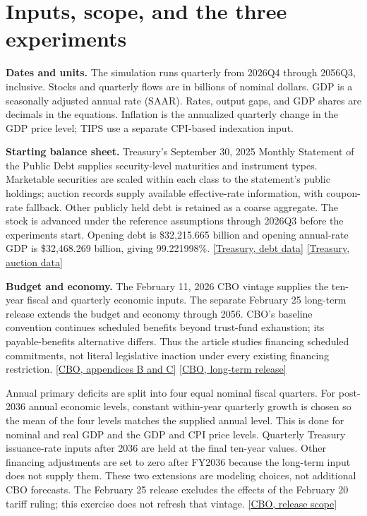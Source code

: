 \documentclass[11pt,letterpaper]{article}
\newcommand{\src}[2]{\href{#1}{#2}}
\begin{document}
\section{Inputs, scope, and the three experiments}

\textbf{Dates and units.}
The simulation runs quarterly from 2026Q4 through 2056Q3, inclusive.
Stocks and quarterly flows are in billions of nominal dollars. GDP is a
seasonally adjusted annual rate (SAAR). Rates, output gaps, and GDP shares are
decimals in the equations. Inflation is the annualized quarterly change in
the GDP price level; TIPS use a separate CPI-based indexation input.

\textbf{Starting balance sheet.}
Treasury's September 30, 2025 Monthly Statement of the Public Debt supplies
security-level maturities and instrument types. Marketable securities are
scaled within each class to the statement's public holdings; auction records
supply available effective-rate information, with coupon-rate fallback.
Other publicly held debt is retained as a coarse aggregate. The stock is
advanced under the reference assumptions through 2026Q3 before the experiments
start. Opening debt is \$32,215.665 billion and opening annual-rate GDP is
\$32,468.269 billion, giving 99.221998\%.
\src{https://fiscaldata.treasury.gov/datasets/monthly-statement-public-debt/}
{[Treasury, debt data]}
\src{https://fiscaldata.treasury.gov/datasets/treasury-securities-auctions-data/}
{[Treasury, auction data]}

\textbf{Budget and economy.}
The February 11, 2026 CBO vintage supplies the ten-year fiscal and quarterly
economic inputs. The separate February 25 long-term release extends the
budget and economy through 2056. CBO's baseline convention continues scheduled
benefits beyond trust-fund exhaustion; its payable-benefits alternative
differs. Thus the article studies financing scheduled commitments, not literal
legislative inaction under every existing financing restriction.
\src{https://www.cbo.gov/publication/62105}{[CBO, appendices B and C]}
\src{https://www.cbo.gov/publication/62044}{[CBO, long-term release]}

Annual primary deficits are split into four equal nominal fiscal quarters.
For post-2036 annual economic levels, constant within-year quarterly growth is
chosen so the mean of the four levels matches the supplied annual level.
This is done for nominal and real GDP and the GDP and CPI price levels.
Quarterly Treasury issuance-rate inputs after 2036 are held at the final
ten-year values. Other financing adjustments are set to zero after FY2036
because the long-term input does not supply them. These two extensions are
modeling choices, not additional CBO forecasts. The February 25 release
excludes the effects of the February 20 tariff ruling; this exercise does not
refresh that vintage.
\src{https://www.cbo.gov/publication/62044}{[CBO, release scope]}
\end{document}

